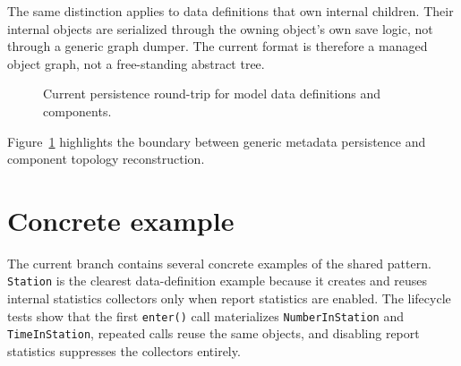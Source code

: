 The same distinction applies to data definitions that own internal children.
Their internal objects are serialized through the owning object's own save
logic, not through a generic graph dumper. The current format is therefore a
managed object graph, not a free-standing abstract tree.

\begin{figure}[htbp]
\centering
\caption{Current persistence round-trip for model data definitions and components.}
\label{fig:model-component-persistence-flow}
\end{figure}

Figure~\ref{fig:model-component-persistence-flow} highlights the boundary
between generic metadata persistence and component topology reconstruction.

\section{Concrete example}
\label{sec:model-component-concrete-example}

The current branch contains several concrete examples of the shared pattern.
\texttt{Station} is the clearest data-definition example because it creates and reuses
internal statistics collectors only when report statistics are enabled. The
lifecycle tests show that the first \texttt{enter()} call materializes
\texttt{NumberInStation} and \texttt{TimeInStation}, repeated calls reuse the same objects,
and disabling report statistics suppresses the collectors entirely.

